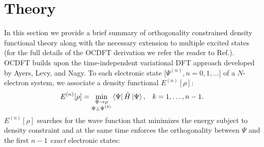 \documentclass[12pt]{article}
\newcommand{\bra}[2][0]
{\ifthenelse{\equal{#1}{0}}{\left\langle #2 \right|}
{\ifthenelse{\equal{#1}{1}}{\big\langle #2 \big|}
{\ifthenelse{\equal{#1}{2}}{\Big\langle #2 \Big|}
{\ifthenelse{\equal{#1}{3}}{\bigg\langle #2 \bigg|}
{\ifthenelse{\equal{#1}{4}}{\Bigg\langle #2 \Bigg|}
{Error}}}}}
}
\newcommand{\ket}[2][0]
{\ifthenelse{\equal{#1}{0}}{\left| #2 \right\rangle}
{\ifthenelse{\equal{#1}{1}}{\big| #2 \big\rangle}
{\ifthenelse{\equal{#1}{2}}{\Big| #2 \Big\rangle}
{\ifthenelse{\equal{#1}{3}}{\bigg| #2 \bigg\rangle}
{\ifthenelse{\equal{#1}{4}}{\Bigg| #2 \Bigg\rangle}
{Error}}}}}
}
\begin{document}
\section{Theory}
In this section we provide a brief summary of orthogonality constrained density functional theory along with the necessary extension to multiple excited states (for the full details of the OCDFT derivation we refer the reader to Ref.).
OCDFT builds upon the time-independent variational DFT approach developed by Ayers, Levy, and Nagy.\cite{ayers_time-independent_2012}
To each electronic state [$\Psi^{(n)}, n=0,1,\ldots$] of a $N$-electron system, we associate a density functional $E^{(n)}[\rho]$:
\begin{equation}
E^{(n)}[\rho] = \min_{
\substack{
\Psi \rightarrow \rho\\
\Psi\bot\Psi^{(k)}
}
}
\bra{\Psi}\hat{H}\ket{\Psi},
\;\;\; k = 1,\ldots,n-1.
\end{equation}
$E^{(n)}[\rho]$ searches for the wave function that minimizes the energy subject to density constraint and at the same time enforces the orthogonality between $\Psi$ and the first $n-1$ \textit{exact} electronic states:
\end{document}
